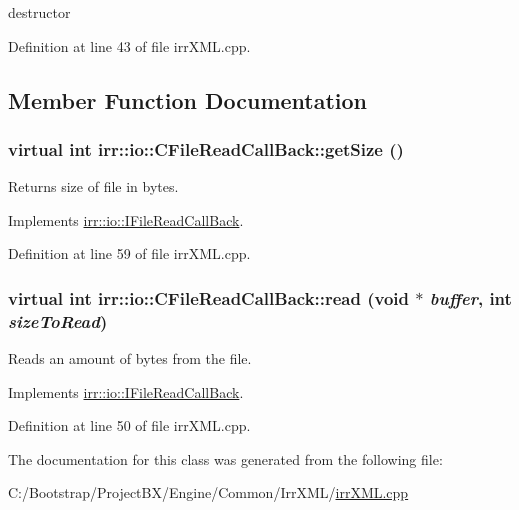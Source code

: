destructor 



Definition at line 43 of file irrXML.cpp.

\subsection{Member Function Documentation}
\hypertarget{classirr_1_1io_1_1_c_file_read_call_back_c84d10241c07f1a8f744ffaad6683eef}{
\subsubsection[{getSize}]{\setlength{\rightskip}{0pt plus 5cm}virtual int irr::io::CFileReadCallBack::getSize ()}}
\label{classirr_1_1io_1_1_c_file_read_call_back_c84d10241c07f1a8f744ffaad6683eef}


Returns size of file in bytes. 



Implements \hyperlink{classirr_1_1io_1_1_i_file_read_call_back_51e3ae6f16cf3058800cb905f3b21b23}{irr::io::IFileReadCallBack}.

Definition at line 59 of file irrXML.cpp.\hypertarget{classirr_1_1io_1_1_c_file_read_call_back_b2d4c4e10cd2b03af1173fbc25f87741}{
\subsubsection[{read}]{\setlength{\rightskip}{0pt plus 5cm}virtual int irr::io::CFileReadCallBack::read (void $\ast$ {\em buffer}, \/  int {\em sizeToRead})}}
\label{classirr_1_1io_1_1_c_file_read_call_back_b2d4c4e10cd2b03af1173fbc25f87741}


Reads an amount of bytes from the file. 



Implements \hyperlink{classirr_1_1io_1_1_i_file_read_call_back_e8c57b8454078aa2acd39772a6aa4439}{irr::io::IFileReadCallBack}.

Definition at line 50 of file irrXML.cpp.

The documentation for this class was generated from the following file:\begin{CompactItemize}
\item 
C:/Bootstrap/ProjectBX/Engine/Common/IrrXML/\hyperlink{irr_x_m_l_8cpp}{irrXML.cpp}\end{CompactItemize}
